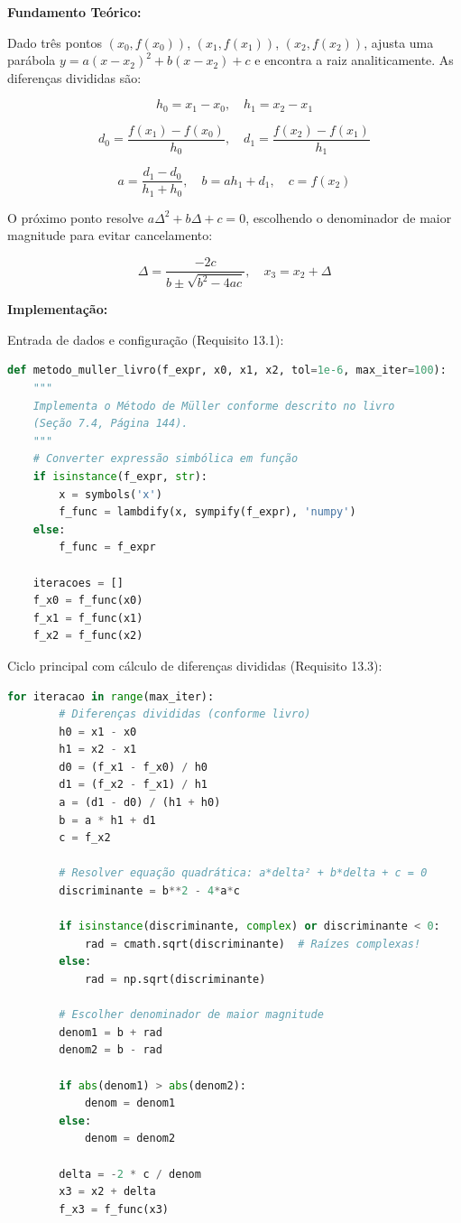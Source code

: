 \documentclass[
	12pt,				%
	openright,			%
	oneside,			%
	a4paper,			%
	english,			%
	brazil				%
	]{abntex2}
\begin{document}
\textbf{Fundamento Teórico:}

Dado três pontos $(x_0, f(x_0))$, $(x_1, f(x_1))$, $(x_2, f(x_2))$, ajusta uma parábola $y = a(x-x_2)^2 + b(x-x_2) + c$ e encontra a raiz analiticamente. As diferenças divididas são:

$$h_0 = x_1 - x_0, \quad h_1 = x_2 - x_1$$

$$d_0 = \frac{f(x_1) - f(x_0)}{h_0}, \quad d_1 = \frac{f(x_2) - f(x_1)}{h_1}$$

$$a = \frac{d_1 - d_0}{h_1 + h_0}, \quad b = a h_1 + d_1, \quad c = f(x_2)$$

O próximo ponto resolve $a\Delta^2 + b\Delta + c = 0$, escolhendo o denominador de maior magnitude para evitar cancelamento:

$$\Delta = \frac{-2c}{b \pm \sqrt{b^2 - 4ac}}, \quad x_3 = x_2 + \Delta$$

\vspace{0.3cm}

\textbf{Implementação:}

Entrada de dados e configuração (Requisito 13.1):

\begin{lstlisting}[language=Python, caption={Requisito 13.1 - Entrada do Método de Müller}]
def metodo_muller_livro(f_expr, x0, x1, x2, tol=1e-6, max_iter=100):
    """
    Implementa o Método de Müller conforme descrito no livro
    (Seção 7.4, Página 144).
    """
    # Converter expressão simbólica em função
    if isinstance(f_expr, str):
        x = symbols('x')
        f_func = lambdify(x, sympify(f_expr), 'numpy')
    else:
        f_func = f_expr
    
    iteracoes = []
    f_x0 = f_func(x0)
    f_x1 = f_func(x1)
    f_x2 = f_func(x2)
\end{lstlisting}

Ciclo principal com cálculo de diferenças divididas (Requisito 13.3):

\begin{lstlisting}[language=Python, caption={Requisito 13.3 - Cálculo de Diferenças Divididas}]
    for iteracao in range(max_iter):
        # Diferenças divididas (conforme livro)
        h0 = x1 - x0
        h1 = x2 - x1
        d0 = (f_x1 - f_x0) / h0
        d1 = (f_x2 - f_x1) / h1
        a = (d1 - d0) / (h1 + h0)
        b = a * h1 + d1
        c = f_x2
        
        # Resolver equação quadrática: a*delta² + b*delta + c = 0
        discriminante = b**2 - 4*a*c
        
        if isinstance(discriminante, complex) or discriminante < 0:
            rad = cmath.sqrt(discriminante)  # Raízes complexas!
        else:
            rad = np.sqrt(discriminante)
        
        # Escolher denominador de maior magnitude
        denom1 = b + rad
        denom2 = b - rad
        
        if abs(denom1) > abs(denom2):
            denom = denom1
        else:
            denom = denom2
        
        delta = -2 * c / denom
        x3 = x2 + delta
        f_x3 = f_func(x3)
\end{lstlisting}
\end{document}
